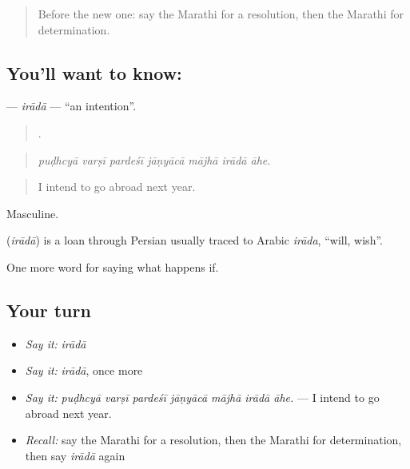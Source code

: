 \label{lesson:MR-C546-irada}



\begin{quote}
Before the new one: say the Marathi for a resolution, then the Marathi for determination.
\end{quote}

\subsection*{You'll want to know: }
\textbf{} — \emph{irādā} — \textquotedblleft{}an intention\textquotedblright{}.

\begin{quote}
      .
\end{quote}

\begin{quote}
\emph{puḍhcyā varṣī pardeśī jāṇyācā mājhā irādā āhe.}
\end{quote}

\begin{quote}
I intend to go abroad next year.
\end{quote}

Masculine.

\begin{cousinweb}
\textbf{} (\emph{irādā}) is a loan through Persian usually traced to Arabic \emph{irāda}, \textquotedblleft{}will, wish\textquotedblright{}.
\end{cousinweb}

\begin{grammarlens}[title={What you've built}]
One more word for saying what happens if.
\end{grammarlens}

\subsection*{Your turn}
\begin{itemize}
\raggedright
  \item \emph{Say it:} \emph{irādā}
  \item \emph{Say it:} \emph{irādā}, once more
  \item \emph{Say it:} \emph{puḍhcyā varṣī pardeśī jāṇyācā mājhā irādā āhe.} — I intend to go abroad next year.
  \item \emph{Recall:} say the Marathi for a resolution, then the Marathi for determination, then say \emph{irādā} again
\end{itemize}

